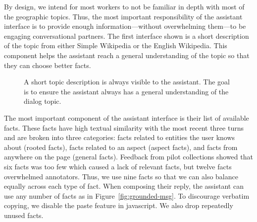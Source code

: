 By design, we intend for most workers to not be familiar in depth with most of the geographic topics.
Thus, the most important responsibility of the assistant interface is to provide enough information---without overwhelming them---to be engaging conversational partners.
The first interface shown is a short description of the topic from either Simple Wikipedia or the English Wikipedia.
This component helps the assistant reach a general understanding of the topic so that they can choose better facts.
\begin{figure}[ht]
    \centering
    \caption{
        A short topic description is always visible to the assistant.
        The goal is to ensure the assistant always has a general understanding of the dialog topic.
    }
    \label{fig:summary}
\end{figure}

The most important component of the assistant interface is their list of available facts.
These facts have high textual similarity with the most recent three turns and are broken into three categories: facts related to entities the user knows about (rooted facts), facts related to an aspect (aspect facts), and facts from anywhere on the page (general facts).
Feedback from pilot collections showed that six facts was too few which caused a lack of relevant facts, but twelve facts overwhelmed annotators.
Thus, we use nine facts so that we can also balance equally across each type of fact.
When composing their reply, the assistant can use any number of facts as in Figure~\ref{fig:grounded-msg}.
To discourage verbatim copying, we disable the paste feature in javascript.
We also drop repeatedly unused facts.

